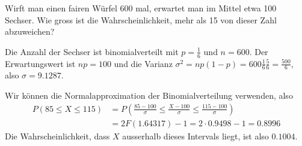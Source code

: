 Wirft man einen fairen Würfel 600 mal, erwartet man im Mittel
etwa 100 Sechser. Wie gross ist die Wahrscheinlichkeit,
mehr als 15 von dieser Zahl abzuweichen?


\begin{loesung}
Die Anzahl der Sechser ist binomialverteilt mit $p=\frac16$
und $n=600$. Der Erwartungswert ist $np=100$ und die
Varianz $\sigma^2=np(1-p)=600\frac16\frac56=\frac{500}6$,
also $\sigma=9.1287$.

Wir können die Normalapproximation der Binomialverteilung verwenden,
also
\begin{align*}
P(85\le X\le 115)
&=
P\left(\frac{85-100}{\sigma}\le\frac{X-100}{\sigma}\le\frac{115-100}{\sigma}\right)
\\
&=
2F(1.64317)-1=2\cdot 0.9498-1=0.8996
\end{align*}
Die Wahrscheinlichkeit, dass $X$ ausserhalb dieses Intervals liegt,
ist also $0.1004$.
\end{loesung}
